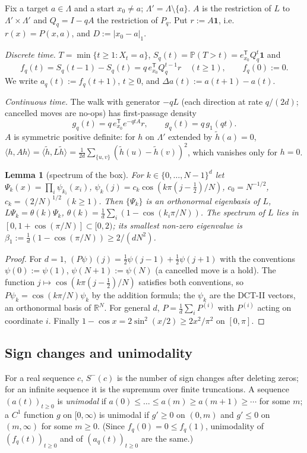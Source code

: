 \documentclass[11pt,a4paper]{article}
\newtheorem{lemma}[theorem]{Lemma}
\theoremstyle{definition}
\newcommand{\one}{\mathbf 1}
\newcommand{\Sm}{S^{-}}
\newcommand{\R}{\mathbb R}
\newcommand{\Prob}{\mathbb P}
\newcommand{\T}{^{\mathsf T}}
\begin{document}
Fix a target $a\in\Lambda$ and a start $x_0\ne a$; $\Lambda'=\Lambda\setminus\{a\}$. $A$ is the restriction of $L$ to $\Lambda'\times\Lambda'$ and $Q_q=I-qA$ the restriction of $P_q$. Put $r:=A\one$, i.e.\ $r(x)=P(x,a)$, and $D:=|x_0-a|_1$.

\emph{Discrete time.} $T=\min\{t\ge1:X_t=a\}$, $S_q(t)=\Prob(T>t)=e_{x_0}\T Q_q^t\one$ and
\begin{equation}\label{eq:pmf}
f_q(t)=S_q(t-1)-S_q(t)=q\,e_{x_0}\T Q_q^{t-1}r\quad(t\ge1),\qquad f_q(0):=0 .
\end{equation}
We write $a_q(t):=f_q(t+1)$, $t\ge0$, and $\Delta a(t):=a(t+1)-a(t)$.

\emph{Continuous time.} The walk with generator $-qL$ (each direction at rate $q/(2d)$; cancelled moves are no-ops) has first-passage density
\begin{equation}\label{eq:dens}
g_q(t)=q\,e_{x_0}\T e^{-qtA}r,\qquad g_q(t)=q\,g_1(qt).
\end{equation}
$A$ is symmetric positive definite: for $h$ on $\Lambda'$ extended by $\tilde h(a)=0$, $\langle h,Ah\rangle=\langle\tilde h,L\tilde h\rangle=\frac1{2d}\sum_{\{u,v\}}(\tilde h(u)-\tilde h(v))^2$, which vanishes only for $h=0$.

\begin{lemma}[spectrum of the box]\label{lem:spec}
For $k\in\{0,\dots,N-1\}^d$ let $\Psi_k(x)=\prod_i\psi_{k_i}(x_i)$, $\psi_k(j)=c_k\cos(k\pi(j-\tfrac12)/N)$, $c_0=N^{-1/2}$, $c_k=(2/N)^{1/2}$ $(k\ge1)$. Then $\{\Psi_k\}$ is an orthonormal eigenbasis of $L$, $L\Psi_k=\theta(k)\Psi_k$, $\theta(k)=\frac1d\sum_i(1-\cos(k_i\pi/N))$. The spectrum of $L$ lies in $[0,1+\cos(\pi/N)]\subset[0,2)$; its smallest non-zero eigenvalue is $\beta_1:=\frac1d(1-\cos(\pi/N))\ge 2/(dN^2)$.
\end{lemma}
\begin{proof}
For $d=1$, $(P\psi)(j)=\frac12\psi(j-1)+\frac12\psi(j+1)$ with the conventions $\psi(0):=\psi(1)$, $\psi(N+1):=\psi(N)$ (a cancelled move is a hold). The function $j\mapsto\cos(k\pi(j-\frac12)/N)$ satisfies both conventions, so $P\psi_k=\cos(k\pi/N)\psi_k$ by the addition formula; the $\psi_k$ are the DCT-II vectors, an orthonormal basis of $\R^N$. For general $d$, $P=\frac1d\sum_iP^{(i)}$ with $P^{(i)}$ acting on coordinate $i$. Finally $1-\cos x=2\sin^2(x/2)\ge2x^2/\pi^2$ on $[0,\pi]$.
\end{proof}

\subsection{Sign changes and unimodality}
For a real sequence $c$, $\Sm(c)$ is the number of sign changes after deleting zeros; for an infinite sequence it is the supremum over finite truncations. A sequence $(a(t))_{t\ge0}$ is \emph{unimodal} if $a(0)\le\dots\le a(m)\ge a(m+1)\ge\cdots$ for some $m$; a $C^1$ function $g$ on $[0,\infty)$ is unimodal if $g'\ge0$ on $(0,m)$ and $g'\le0$ on $(m,\infty)$ for some $m\ge0$. (Since $f_q(0)=0\le f_q(1)$, unimodality of $(f_q(t))_{t\ge0}$ and of $(a_q(t))_{t\ge0}$ are the same.)
\end{document}
